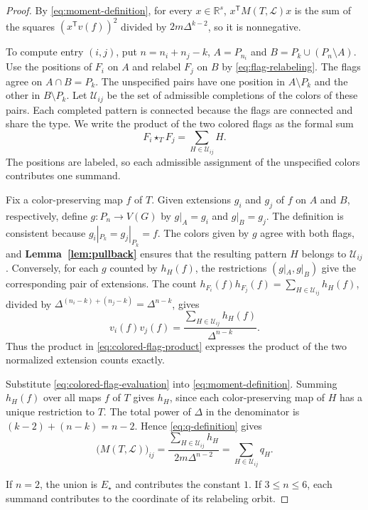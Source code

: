 \documentclass[preprint,11pt,numbers]{elsarticle-arxiv}
\numberwithin{equation}{section}
\theoremstyle{definition}
\begin{document}
\begin{proof}
By \eqref{eq:moment-definition}, for every $x\in\mathbb R^s$,
$x^{\mathsf T}M(T,\mathcal L)x$ is the sum of the squares
$(x^{\mathsf T}v(f))^2$ divided by $2m\Delta^{k-2}$, so it is
nonnegative.

To compute entry $(i,j)$, put $n=n_i+n_j-k$, $A=P_{n_i}$ and
$B=P_k\cup(P_n\setminus A)$. Use the positions of $F_i$ on $A$ and
relabel $F_j$ on $B$ by \eqref{eq:flag-relabeling}. The flags agree
on $A\cap B=P_k$. The unspecified pairs have one position in
$A\setminus P_k$ and the other in $B\setminus P_k$.
Let $\mathcal U_{ij}$ be the set of admissible completions of the
colors of these pairs. Each completed pattern is connected because
the flags are connected and share the type. We write the product of
the two colored flags as the formal sum
\begin{equation}\label{eq:colored-flag-product}
 F_i\star_T F_j=\sum_{H\in\mathcal U_{ij}}H.
\end{equation}
The positions are labeled, so each admissible assignment of
the unspecified colors contributes one summand.

Fix a color-preserving map $f$ of $T$. Given extensions $g_i$ and
$g_j$ of $f$ on $A$ and $B$, respectively, define
$g\colon P_n\to V(G)$ by $g|_A=g_i$ and $g|_B=g_j$. The definition
is consistent because $g_i|_{P_k}=g_j|_{P_k}=f$. The colors given
by $g$ agree with both flags, and
\textbf{Lemma~\ref{lem:pullback}} ensures that the resulting
pattern $H$ belongs to $\mathcal U_{ij}$. Conversely, for each
$g$ counted by $h_H(f)$, the restrictions $(g|_A,g|_B)$ give
the corresponding pair of extensions. The count
$h_{F_i}(f)h_{F_j}(f)=\sum_{H\in\mathcal U_{ij}}h_H(f)$,
divided by $\Delta^{(n_i-k)+(n_j-k)}=\Delta^{n-k}$, gives
\begin{equation}\label{eq:colored-flag-evaluation}
 v_i(f)v_j(f)=\frac{\displaystyle\sum_{H\in\mathcal U_{ij}}h_H(f)}
                         {\Delta^{n-k}}.
\end{equation}
Thus the product in \eqref{eq:colored-flag-product} expresses the
product of the two normalized extension counts exactly.

Substitute \eqref{eq:colored-flag-evaluation} into
\eqref{eq:moment-definition}. Summing $h_H(f)$ over all maps
$f$ of $T$ gives $h_H$, since each color-preserving map of $H$
has a unique restriction to $T$. The total power of $\Delta$ in
the denominator is $(k-2)+(n-k)=n-2$. Hence
\eqref{eq:q-definition} gives
\begin{equation}\label{eq:moment-expansion}
 \bigl(M(T,\mathcal L)\bigr)_{ij}
 =\frac{\displaystyle\sum_{H\in\mathcal U_{ij}}h_H}{2m\Delta^{n-2}}
 =\sum_{H\in\mathcal U_{ij}}q_H.
\end{equation}

If $n=2$, the union is $E_\star$ and contributes the constant $1$.
If $3\leq n\leq6$, each summand contributes to the coordinate of
its relabeling orbit.
\end{proof}
\end{document}
